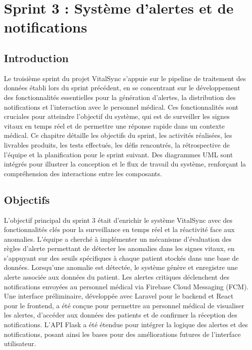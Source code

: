 \chapter{Sprint 3 : Système d'alertes et de notifications}
\label{chap:sprint3}

\section*{Introduction}
Le troisième sprint du projet VitalSync s’appuie sur le pipeline de traitement des données établi lors du sprint précédent, en se concentrant sur le développement des fonctionnalités essentielles pour la génération d’alertes, la distribution des notifications et l’interaction avec le personnel médical. Ces fonctionnalités sont cruciales pour atteindre l’objectif du système, qui est de surveiller les signes vitaux en temps réel et de permettre une réponse rapide dans un contexte médical. Ce chapitre détaille les objectifs du sprint, les activités réalisées, les livrables produits, les tests effectués, les défis rencontrés, la rétrospective de l’équipe et la planification pour le sprint suivant. Des diagrammes UML sont intégrés pour illustrer la conception et le flux de travail du système, renforçant la compréhension des interactions entre les composants.

\section{Objectifs}
L’objectif principal du sprint 3 était d’enrichir le système VitalSync avec des fonctionnalités clés pour la surveillance en temps réel et la réactivité face aux anomalies. L’équipe a cherché à implémenter un mécanisme d’évaluation des règles d’alerte permettant de détecter les anomalies dans les signes vitaux, en s’appuyant sur des seuils spécifiques à chaque patient stockés dans une base de données. Lorsqu’une anomalie est détectée, le système génère et enregistre une alerte associée aux données du patient. Les alertes critiques déclenchent des notifications envoyées au personnel médical via Firebase Cloud Messaging (FCM). Une interface préliminaire, développée avec Laravel pour le backend et React pour le frontend, a été conçue pour permettre au personnel médical de visualiser les alertes, d’accéder aux données des patients et de confirmer la réception des notifications. L’API Flask a été étendue pour intégrer la logique des alertes et des notifications, posant ainsi les bases pour des améliorations futures de l’interface utilisateur.


